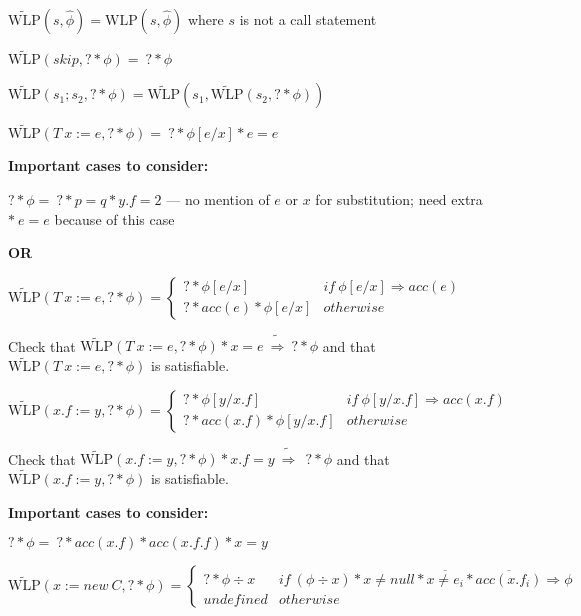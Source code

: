 \documentclass {article}
\newcommand{\eif}[3]{if \ ( #1 ) \ \{ #2 \} \ else \ \{#3\}}
\newcommand{\fphi}{\widehat{\phi}}
\newcommand{\imp}{\Rightarrow}
\newcommand{\timp}{\ \widetilde{\Rightarrow}\ }
\newcommand{\wlp}[2]{\text{WLP}(#1,#2)}
\newcommand{\twlp}[2]{\widetilde{\text{WLP}}(#1,#2)}
\begin{document}
$\twlp{s}{\fphi} = \wlp{s}{\fphi} $ where $s$ is not a call statement

\vspace{0.5cm}

$\twlp{skip}{? \ast \phi} = \ ? \ast \phi$

\vspace{0.5cm}

$\twlp{s_1;s_2}{? \ast \phi} = \twlp{s_1}{\twlp{s_2}{? \ast \phi}} $

\vspace{0.5cm}

$\twlp{T \ x := e}{? \ast \phi} = \ ? \ast \phi[e/x] \ast e = e$

\textbf{Important cases to consider:}

$? \ast \phi = \ ? \ast p = q \ast y.f = 2$ --- no mention of $e$ or $x$ for substitution; need extra $\ast \ e = e$ because of this case

\textbf{OR}

$\twlp{T \ x := e}{? \ast \phi} =
	 \begin{cases}
	 ? \ast \phi[e/x] & if \ \phi[e/x] \imp acc(e) \\
	 ? \ast acc(e) \ast \phi[e/x] & otherwise
	\end{cases}$
	
Check that $\twlp{T \ x := e}{? \ast \phi} \ast x = e \timp ? \ast \phi$ and that $\twlp{T \ x := e}{? \ast \phi}$ is satisfiable.

\vspace{0.5cm}

%

$\twlp{x.f := y}{? \ast \phi} =
	\begin{cases}
	 ? \ast \phi[y/x.f] & if \ \phi[y/x.f] \imp acc(x.f) \\
	 ? \ast acc(x.f) \ast \phi[y/x.f] & otherwise
	\end{cases}$

Check that $\twlp{x.f := y}{? \ast \phi} \ast x.f = y \timp \ ? \ast \phi$ and that $\twlp{x.f := y}{? \ast \phi}$ is satisfiable.

\textbf{Important cases to consider:}

$? \ast \phi = \ ? \ast acc(x.f) \ast acc(x.f.f) \ast x = y $

\vspace{0.5cm}

$\twlp{x := new\ C}{? \ast \phi} = 
	\begin{cases}
	 ? \ast \phi \div x & if \ (\phi \div x) \ast x \neq null \ast \overline{x \neq e_i} \ast \overline{acc(x.f_i)} \imp \phi \\
	 undefined & otherwise
	\end{cases}$ 
\end{document}
